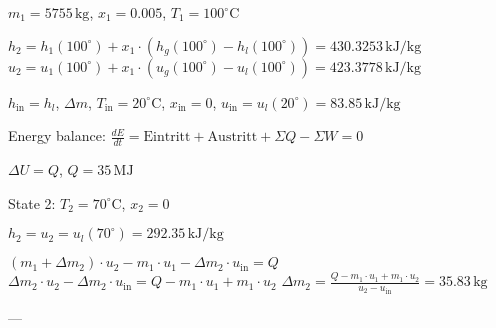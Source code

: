 \( m_1 = 5755 \, \text{kg} \), \( x_1 = 0.005 \), \( T_1 = 100^\circ \text{C} \)  

\( h_2 = h_1(100^\circ) + x_1 \cdot (h_g(100^\circ) - h_l(100^\circ)) = 430.3253 \, \text{kJ/kg} \)  
\( u_2 = u_1(100^\circ) + x_1 \cdot (u_g(100^\circ) - u_l(100^\circ)) = 423.3778 \, \text{kJ/kg} \)  

\( h_{\text{in}} = h_l \), \( \Delta m \), \( T_{\text{in}} = 20^\circ \text{C} \), \( x_{\text{in}} = 0 \), \( u_{\text{in}} = u_l(20^\circ) = 83.85 \, \text{kJ/kg} \)  

Energy balance:  
\( \frac{dE}{dt} = \text{Eintritt} + \text{Austritt} + \Sigma Q - \Sigma W = 0 \)  

\( \Delta U = Q \), \( Q = 35 \, \text{MJ} \)  

State 2: \( T_2 = 70^\circ \text{C} \), \( x_2 = 0 \)  

\( h_2 = u_2 = u_l(70^\circ) = 292.35 \, \text{kJ/kg} \)  

\( (m_1 + \Delta m_2) \cdot u_2 - m_1 \cdot u_1 - \Delta m_2 \cdot u_{\text{in}} = Q \)  
\( \Delta m_2 \cdot u_2 - \Delta m_2 \cdot u_{\text{in}} = Q - m_1 \cdot u_1 + m_1 \cdot u_2 \)  
\( \Delta m_2 = \frac{Q - m_1 \cdot u_1 + m_1 \cdot u_2}{u_2 - u_{\text{in}}} = 35.83 \, \text{kg} \)  

---
